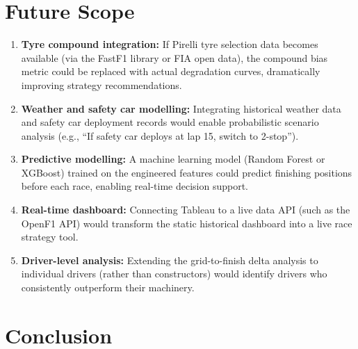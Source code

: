 \documentclass[12pt, a4paper]{article}
\begin{document}
\section{Future Scope}

\begin{enumerate}
    \item \textbf{Tyre compound integration:} If Pirelli tyre selection data becomes available (via the FastF1 library or FIA open data), the compound bias metric could be replaced with actual degradation curves, dramatically improving strategy recommendations.

    \item \textbf{Weather and safety car modelling:} Integrating historical weather data and safety car deployment records would enable probabilistic scenario analysis (e.g., ``If safety car deploys at lap 15, switch to 2-stop'').

    \item \textbf{Predictive modelling:} A machine learning model (Random Forest or XGBoost) trained on the engineered features could predict finishing positions before each race, enabling real-time decision support.

    \item \textbf{Real-time dashboard:} Connecting Tableau to a live data API (such as the OpenF1 API) would transform the static historical dashboard into a live race strategy tool.

    \item \textbf{Driver-level analysis:} Extending the grid-to-finish delta analysis to individual drivers (rather than constructors) would identify drivers who consistently outperform their machinery.
\end{enumerate}

\newpage

\section{Conclusion}
\end{document}
